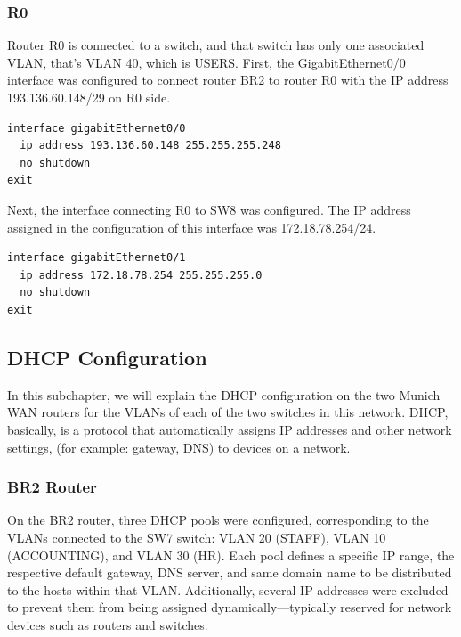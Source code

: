 \subsubsection*{R0}

Router R0 is connected to a switch, and that switch has only one associated VLAN, that's VLAN 40, which is USERS. 
First, the GigabitEthernet0/0 interface was configured to connect router BR2 to router R0 with the IP address 193.136.60.148/29 on R0 side.

\begin{lstlisting}[caption={Interface GigabitEthernet0/0 configuration on R0}, label={lst:r0-br2connection}]
interface gigabitEthernet0/0
  ip address 193.136.60.148 255.255.255.248
  no shutdown
exit
\end{lstlisting}

Next, the interface connecting R0 to SW8 was configured. The IP address assigned in the configuration of this interface was 172.18.78.254/24.
\begin{lstlisting}[caption={Configuring the GigabitEthernet0/1 interface on R0}, label={lst:r0-if_gb0/0}]
interface gigabitEthernet0/1
  ip address 172.18.78.254 255.255.255.0
  no shutdown
exit
\end{lstlisting}


\subsection{DHCP Configuration}
In this subchapter, we will explain the DHCP configuration on the two Munich WAN routers for the VLANs of each of the two switches in this network.
DHCP, basically, is a protocol that automatically assigns IP addresses and other network settings, (for example: gateway, DNS) to devices on a network.

\vspace{0.1cm}
\subsubsection*{BR2 Router}
On the BR2 router, three DHCP pools were configured, corresponding to the VLANs connected to the SW7 switch: VLAN 20 (STAFF), VLAN 10 (ACCOUNTING), and VLAN 30 (HR).  
Each pool defines a specific IP range, the respective default gateway, DNS server, and same domain name to be distributed to the hosts within that VLAN. Additionally, several IP addresses were excluded to prevent them from being assigned dynamically—typically reserved for network devices such as routers and switches.

